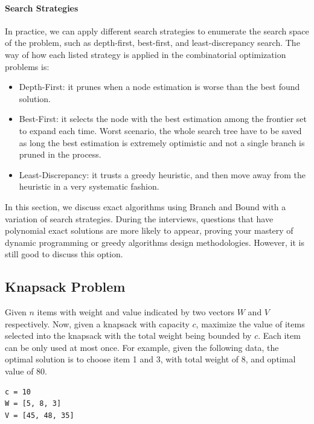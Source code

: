 \documentclass[../main.tex]{subfiles}
\begin{document}
\paragraph{Search Strategies} In practice, we can apply different search strategies to enumerate the search space of the problem, such as depth-first, best-first, and least-discrepancy search. The way of how each listed strategy is applied in the combinatorial optimization problems is:
\begin{itemize}
    \item Depth-First: it prunes when a node estimation is worse than the best found solution.
    \item Best-First: it selects the node with the best estimation among the frontier set to expand each time. Worst scenario, the whole search tree have to be saved as long the best estimation is extremely optimistic and not a single branch is pruned in the process. 
    \item Least-Discrepancy: it trusts a greedy heuristic, and then move away from the heuristic in a very systematic fashion. 
\end{itemize}

In this section, we discuss exact algorithms using Branch and Bound with a variation of search strategies. During the interviews, questions that have polynomial exact solutions are more likely to appear, proving your mastery of dynamic programming or greedy algorithms design methodologies. However, it is still good to discuss this option. 

\subsection{Knapsack Problem}

Given $n$ items with weight and value indicated by two vectors $W$ and $V$ respectively. Now, given a knapsack with capacity $c$, maximize the value of items selected into the knapsack with the total weight being bounded by $c$. Each item can be only used at most once. For example, given the following data, the optimal solution is to  choose item 1 and 3, with total weight of 8, and optimal value of 80.
\begin{lstlisting}[numbers=none]
c = 10
W = [5, 8, 3]
V = [45, 48, 35]
\end{lstlisting}
\end{document}
